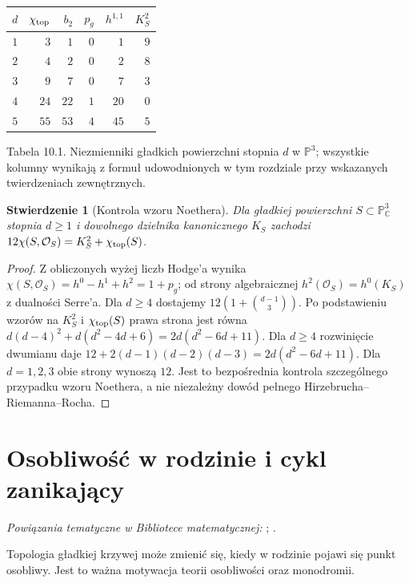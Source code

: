 \documentclass[11pt,a4paper,openany]{report}
\numberwithin{equation}{section}
\theoremstyle{plain}
\newtheorem{stwierdzenie}[twierdzenie]{Stwierdzenie}
\theoremstyle{definition}
\theoremstyle{remark}
\newcommand{\C}{\mathbb C}
\newcommand{\PP}{\mathbb P}
\begin{document}
\begin{center}
\small
\begin{tabular}{c|r|r|r|r|r}
$d$ & $\chi_{\rm top}$ & $b_2$ & $p_g$ & $h^{1,1}$ & $K_S^2$\\\hline
$1$ & $3$ & $1$ & $0$ & $1$ & $9$\\
$2$ & $4$ & $2$ & $0$ & $2$ & $8$\\
$3$ & $9$ & $7$ & $0$ & $7$ & $3$\\
$4$ & $24$ & $22$ & $1$ & $20$ & $0$\\
$5$ & $55$ & $53$ & $4$ & $45$ & $5$
\end{tabular}

\smallskip
{\small Tabela 10.1. Niezmienniki gładkich powierzchni
stopnia $d$ w $\PP^3$; wszystkie kolumny wynikają
z formuł udowodnionych w tym rozdziale przy wskazanych
twierdzeniach zewnętrznych.}\par
\end{center}

\begin{stwierdzenie}[Kontrola wzoru Noethera]
Dla gładkiej powierzchni $S\subset\PP^3_\C$ stopnia $d\ge1$
i dowolnego dzielnika kanonicznego $K_S$ zachodzi
$12\chi(S,\mathcal O_S)=K_S^2+\chi_{\rm top}(S)$.
\end{stwierdzenie}
\begin{proof}
Z obliczonych wyżej liczb Hodge'a wynika
$\chi(S,\mathcal O_S)=h^0-h^1+h^2=1+p_g$;
od strony algebraicznej $h^2(\mathcal O_S)=h^0(K_S)$
z dualności Serre'a. Dla $d\ge4$ dostajemy
$12(1+\binom{d-1}{3})$.
Po podstawieniu wzorów na $K_S^2$ i
$\chi_{\rm top}(S)$ prawa strona jest równa
$d(d-4)^2+d(d^2-4d+6)=2d(d^2-6d+11)$.
Dla $d\ge4$ rozwinięcie dwumianu daje
$12+2(d-1)(d-2)(d-3)=2d(d^2-6d+11)$.
Dla $d=1,2,3$ obie strony wynoszą $12$.
Jest to bezpośrednia kontrola szczególnego przypadku
wzoru Noethera, a nie niezależny dowód pełnego
Hirzebrucha--Riemanna--Rocha.
\end{proof}

\section{Osobliwość w rodzinie i cykl zanikający}
\label{sec:ga10-vanishing}

\noindent\emph{Powiązania tematyczne w Bibliotece matematycznej:} ; .


Topologia gładkiej krzywej może zmienić się, kiedy
w rodzinie pojawi się punkt osobliwy. Jest to ważna
motywacja teorii osobliwości oraz monodromii.
\end{document}
